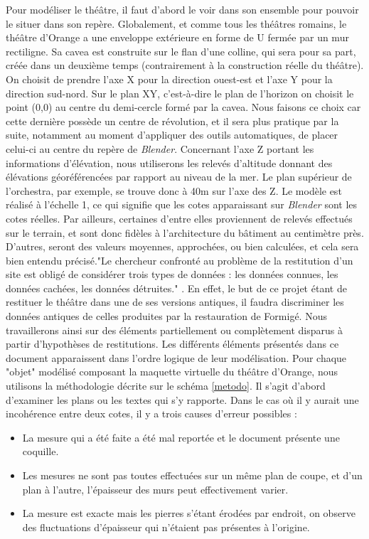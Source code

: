 Pour modéliser le théâtre, il faut d'abord le voir dans son ensemble pour pouvoir le situer dans son repère. Globalement, et comme tous les théâtres romains, le théâtre d'Orange a une enveloppe extérieure en forme de U fermée par un mur rectiligne. Sa \gls{cavea} est construite sur le flan d'une colline, qui sera pour sa part, créée dans un deuxième temps (contrairement à la construction réelle du théâtre). On choisit de prendre l'axe X pour la direction ouest-est et l'axe Y pour la direction sud-nord. Sur le plan XY, c'est-à-dire le plan de l'horizon on choisit le point (0,0) au centre du demi-cercle formé par la \gls{cavea}. Nous faisons ce choix car cette dernière possède un centre de révolution, et il sera plus pratique par la suite, notamment au moment d'appliquer des outils automatiques, de placer celui-ci au centre du repère de \textit{Blender}. Concernant l'axe Z portant les informations d'élévation, nous utiliserons les relevés d'altitude \cite[Pl. XXIX, XLIV, XLVIII, XLIX, LX]{orangePl} donnant des élévations géoréférencées par rapport au niveau de la mer. Le plan supérieur de l'\gls{orchestra}, par exemple, se trouve donc à 40m sur l'axe des Z. Le modèle est réalisé à l'échelle 1, ce qui signifie que les cotes apparaissant sur \textit{Blender} sont les cotes réelles. Par ailleurs, certaines d'entre elles proviennent de relevés effectués sur le terrain, et sont donc fidèles à l'architecture du bâtiment au centimètre près. D'autres, seront des valeurs moyennes, approchées, ou bien calculées, et cela sera bien entendu précisé."Le chercheur confronté au problème de la restitution d’un site est obligé de considérer trois types de données : les données connues, les données cachées, les données détruites." \cite[p. 27]{golvin}. En effet, le but de ce projet étant de restituer le théâtre dans une de ses versions antiques, il faudra discriminer les données antiques de celles produites par la restauration de Formigé. Nous travaillerons ainsi sur des éléments partiellement ou complètement disparus à partir d'hypothèses de restitutions. Les différents éléments présentés dans ce document apparaissent dans l'ordre logique de leur modélisation. Pour chaque "objet" modélisé composant la maquette virtuelle du théâtre d'Orange, nous utilisons la méthodologie décrite sur le schéma \ref{metodo}. Il s'agit d'abord d'examiner les plans ou les textes qui s'y rapporte. Dans le cas où il y aurait une incohérence entre deux cotes, il y a trois causes d'erreur possibles :
\begin{itemize}
	\item La mesure qui a été faite a été mal reportée et le document présente une coquille.
	\item Les mesures ne sont pas toutes effectuées sur un même plan de coupe, et d'un plan à l'autre, l'épaisseur des murs peut effectivement varier.
	\item La mesure est exacte mais les pierres s'étant érodées par endroit, on observe des fluctuations d'épaisseur qui n'étaient pas présentes à l'origine.
\end{itemize}
